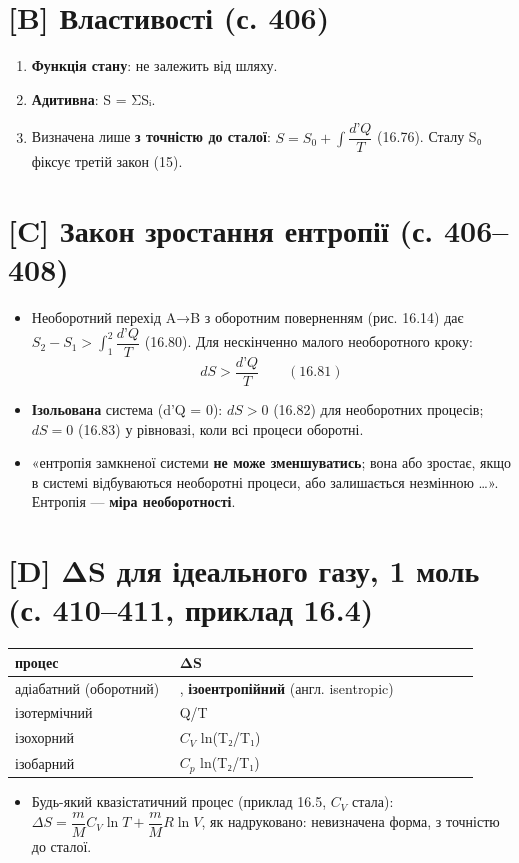 \documentclass[11pt,a4paper,oneside]{book}
\begin{document}
\section*{[B] Властивості (с. 406)}
\begin{enumerate}
\item \textbf{Функція стану}: не залежить від шляху.
\item \textbf{Адитивна}: S = ΣSᵢ.
\item Визначена лише \textbf{з точністю до сталої}: $S = S_0 + \int\dfrac{d\text{'}Q}T$ (16.76). Сталу S₀ фіксує третій закон (15).
\end{enumerate}

\section*{[C] Закон зростання ентропії (с. 406–408)}
\begin{itemize}
\item Необоротний перехід A→B з оборотним поверненням (рис. 16.14) дає $S_2 - S_1 > \int_1^2\dfrac{d\text{'}Q}T$ (16.80). Для нескінченно малого необоротного кроку:
\[dS > \frac{d\text{'}Q}T\qquad(16.81)\]
\item \textbf{Ізольована} система (d'Q = 0): $dS > 0$ (16.82) для необоротних процесів; $dS = 0$ (16.83) у рівновазі, коли всі процеси оборотні.
\item «ентропія замкненої системи \textbf{не може зменшуватись}; вона або зростає, якщо в системі відбуваються необоротні процеси, або залишається незмінною …». Ентропія — \textbf{міра необоротності}.
\end{itemize}

\section*{[D] ΔS для ідеального газу, 1 моль (с. 410–411, приклад 16.4)}
{\small
\begin{longtable}{>{\raggedright\arraybackslash}p{0.343\linewidth}>{\raggedright\arraybackslash}p{0.625\linewidth}}
\toprule
\textbf{процес} & \textbf{ΔS} \\
\midrule
\endhead
адіабатний (оборотний) & 0, \textbf{ізоентропійний} (англ. isentropic) \\
ізотермічний & Q/T \\
ізохорний & $C_{V}$ ln(T₂/T₁) \\
ізобарний & $C_{p}$ ln(T₂/T₁) \\
\bottomrule
\end{longtable}
}
\begin{itemize}
\item Будь-який квазістатичний процес (приклад 16.5, $C_{V}$ стала): $\Delta S = \dfrac mMC_V\ln T + \dfrac mMR\ln V$, як надруковано: невизначена форма, з точністю до сталої.
\end{itemize}
\end{document}
